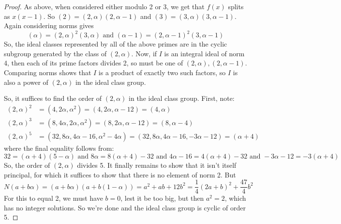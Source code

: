 \begin{proof}
	As above, when considered either modulo 2 or 3, we get that $f(x)$ splits as $x(x-1)$. So $(2) = (2,\alpha)(2,\alpha-1)$ and $(3) = (3,\alpha)(3,\alpha-1)$. Again considering norms gives
	\[ (\alpha) = (2,\alpha)^2(3,\alpha) \text{ and } (\alpha-1) = (2,\alpha-1)^2(3,\alpha-1) \]
	So, the ideal classes represented by all of the above primes are in the cyclic subgroup generated by the class of $(2,\alpha)$. Now, if $I$ is an integral ideal of norm 4, then each of its prime factors divides 2, so must be one of $(2,\alpha),(2,\alpha-1)$. Comparing norms shows that $I$ is a product of exactly two such factors, so $I$ is also a power of $(2,\alpha)$ in the ideal class group.
	
	So, it suffices to find the order of $(2,\alpha)$ in the ideal class group. First, note:
	\begin{align*}
	(2,\alpha)^2 &= (4,2\alpha,\alpha^2) = (4,2\alpha,\alpha-12) = (4,\alpha) \\
	(2,\alpha)^3 &= (8,4\alpha,2\alpha,\alpha^2) = (8,2\alpha,\alpha-12) = (8,\alpha-4) \\
	(2,\alpha)^5 &= (32,8\alpha,4\alpha-16,\alpha^2-4\alpha) = (32,8\alpha,4\alpha-16,-3\alpha-12) = (\alpha+4)
	\end{align*}
	where the final equality follows from:
	\[ 32 = (\alpha+4)(5-\alpha) \text{ and } 8\alpha = 8(\alpha+4)-32 \text{ and } 4\alpha-16 = 4(\alpha+4)-32 \text{ and } -3\alpha-12 = -3(\alpha+4) \]
	So, the order of $(2,\alpha)$ divides 5. It finally remains to show that it isn't itself principal, for which it suffices to show that there is no element of norm 2. But
	\[ N(a+b\alpha) = (a+b\alpha)(a+b(1-\alpha)) = a^2+ab+12b^2 = \frac{1}{4}(2a+b)^2 + \frac{47}{4}b^2 \]
	For this to equal 2, we must have $b=0$, lest it be too big, but then $a^2 = 2$, which has no integer solutions. So we're done and the ideal class group is cyclic of order 5.
\end{proof}

